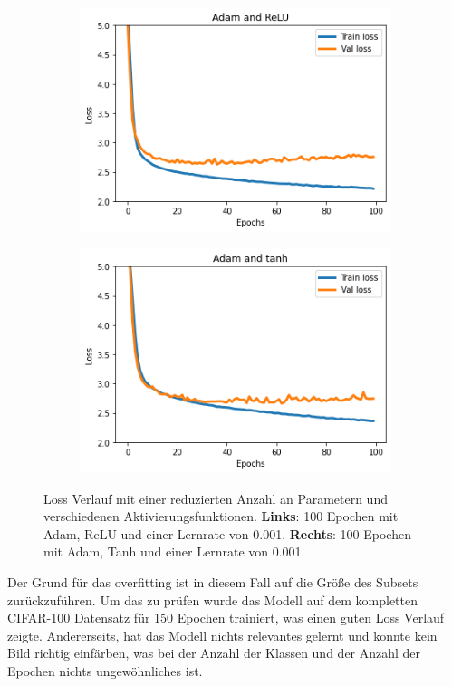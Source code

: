 \begin{figure}[H]
  \centering
  \vspace{1cm}
  \begin{subfigure}
    \centering
    \includegraphics[width=.48\textwidth]{resources/experiments/cifar-adam-relu.png}
  \end{subfigure}
  \begin{subfigure}
    \centering
    \includegraphics[width=.48\textwidth]{resources/experiments/cifar-adam-tanh-100.png}
  \end{subfigure}

  \caption{Loss Verlauf mit einer reduzierten Anzahl an Parametern und verschiedenen Aktivierungsfunktionen.
    \textbf{Links}: 100 Epochen mit Adam, ReLU und einer Lernrate von 0.001. \textbf{Rechts}: 100 Epochen mit Adam, Tanh und einer Lernrate von 0.001.}
  \label{image:gute-ergebnisse-cifar}
\end{figure}

Der Grund für das \gls{overfitting} ist in diesem Fall auf die Größe des Subsets zurückzuführen. Um das zu prüfen wurde das Modell auf dem kompletten CIFAR-100
Datensatz für 150 Epochen trainiert, was einen guten Loss Verlauf zeigte. Andererseits, hat das Modell nichts relevantes gelernt und
konnte kein Bild richtig einfärben, was bei der Anzahl der Klassen und der Anzahl der Epochen nichts ungewöhnliches ist.

